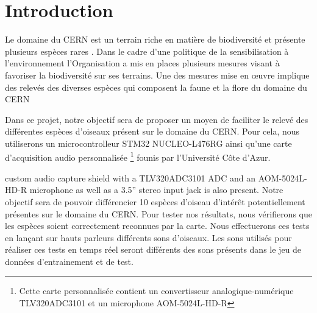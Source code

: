 \chapter{Introduction}

Le domaine du CERN est un terrain riche en matière de biodiversité et présente plusieurs espèces rares \cite{CernBiodiversity1}.
Dans le cadre d'une politique de la sensibilisation à l'environnement l'Organisation a mis en places plusieurs mesures
visant à favoriser la biodiversité sur ses terrains. 
Une des mesures mise en \oe{}uvre implique des relevés des diverses espèces 
qui composent la faune et la flore du domaine du CERN \cite{CernBiodiversity2}

Dans ce projet, notre objectif sera de proposer un moyen de faciliter le relevé des différentes espèces d'oiseaux
présent sur le domaine du CERN.
Pour cela, nous utiliserons un microcontrolleur STM32 NUCLEO-L476RG ainsi qu'une carte d'acquisition audio personnalisée 
\footnote{Cette carte personnalisée contient un convertisseur analogique-numérique TLV320ADC3101 et un microphone AOM-5024L-HD-R}
founis par l'Université Côte d'Azur. 

 custom audio capture shield with a TLV320ADC3101 ADC and an AOM-5024L-HD-R microphone as well as a 3.5” stereo input jack is also present.
Notre objectif sera de pouvoir différencier 10 espèces d'oiseau d'intérêt potentiellement présentes sur le domaine du CERN.
Pour tester nos résultats, nous vérifierons que les espèces soient correctement reconnues par la carte. Nous effectuerons ces tests
en lançant sur hauts parleurs différents sons d'oiseaux. 
Les sons utilisés pour réaliser ces tests en temps réel seront différents des sons présents dans le jeu de données d'entrainement et de test.
